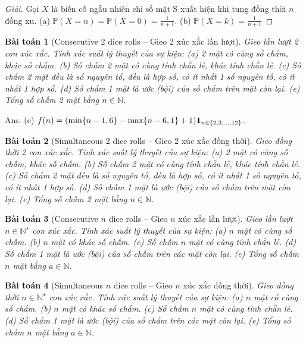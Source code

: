 \documentclass{article}
\newtheorem{baitoan}{Bài toán}
\begin{document}
\begin{proof}[Giải]
	Gọi $X$ là biến cố ngẫu nhiên chỉ số mặt S xuất hiện khi tung đồng thời $n$ đồng xu. (a) $\mathbb{P}(X = n) = \mathbb{P}(X = 0) = \frac{1}{n + 1}$. (b) $\mathbb{P}(X = k) = \frac{1}{n + 1}$
\end{proof}

\begin{baitoan}[Consecutive 2 dice rolls -- Gieo 2 xúc xắc lần lượt]
	Gieo lần lượt 2 con xúc xắc. Tính xác suất lý thuyết của sự kiện: (a) 2 mặt có cùng số chấm, khác số chấm. (b) Số chấm 2 mặt có cùng tính chẵn lẻ, khác tính chẵn lẻ. (c) Số chấm 2 mặt đều là số nguyên tố, đều là hợp số, có ít nhất 1 số nguyên tố, có ít nhất 1 hợp số. (d) Số chấm 1 mặt là ước (bội) của số chấm trên mặt còn lại. (e) Tổng số chấm 2 mặt bằng $n\in\mathbb{N}$.
\end{baitoan}
{\sf Ans.} (e) $f(n) = (\min\{n - 1, 6\} - \max\{n - 6,1\} + 1){\bf1}_{n\in\{2,3,\ldots,12\}}$.

\begin{baitoan}[Simultaneous 2 dice rolls -- Gieo 2 xúc xắc đồng thời]
	Gieo đồng thời 2 con xúc xắc. Tính xác suất lý thuyết của sự kiện: (a) 2 mặt có cùng số chấm, khác số chấm. (b) Số chấm 2 mặt có cùng tính chẵn lẻ, khác tính chẵn lẻ. (c) Số chấm 2 mặt đều là số nguyên tố, đều là hợp số, có ít nhất 1 số nguyên tố, có ít nhất 1 hợp số. (d) Số chấm 1 mặt là ước (bội) của số chấm trên mặt còn lại. (e) Tổng số chấm 2 mặt bằng $n\in\mathbb{N}$.
\end{baitoan}

\begin{baitoan}[Consecutive $n$ dice rolls -- Gieo $n$ xúc xắc lần lượt]
	Gieo lần lượt $n\in\mathbb{N}^\star$ con xúc xắc. Tính xác suất lý thuyết của sự kiện: (a) $n$ mặt có cùng số chấm. (b) $n$ mặt có khác số chấm. (c) Số chấm $n$ mặt có cùng tính chẵn lẻ. (d) Số chấm 1 mặt là ước (bội) của số chấm trên các mặt còn lại. (e) Tổng số chấm $n$ mặt bằng $a\in\mathbb{N}$.
\end{baitoan}

\begin{baitoan}[Simultaneous $n$ dice rolls -- Gieo $n$ xúc xắc đồng thời]
	Gieo đồng thời $n\in\mathbb{N}^\star$ con xúc xắc. Tính xác suất lý thuyết của sự kiện: (a) $n$ mặt có cùng số chấm. (b) $n$ mặt có khác số chấm. (c) Số chấm $n$ mặt có cùng tính chẵn lẻ. (d) Số chấm 1 mặt là ước (bội) của số chấm trên các mặt còn lại. (e) Tổng số chấm $n$ mặt bằng $a\in\mathbb{N}$.
\end{baitoan}
\end{document}
